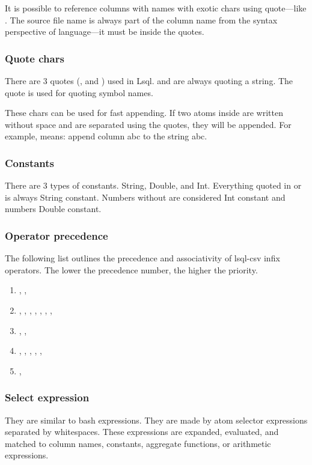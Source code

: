 It is possible to reference columns with names with exotic chars using  quote---like . The source file name is always part of the column name from the syntax perspective of language---it must be inside the quotes.

\subsubsection{Quote chars}
There are 3 quotes (,  and ) used in Lsql.  and  are always quoting a string. The  quote is used for quoting symbol names.

These chars can be used for fast appending. If two atoms inside  are written without space and are separated using the quotes, they will be appended. For example,  means: append column abc to the string abc.

\subsubsection{Constants}
There are 3 types of constants. String, Double, and Int. Everything quoted in  or  is always String constant. Numbers without \icode{[0-9]+} are considered Int constant and numbers  Double constant.

\subsubsection{Operator precedence}
The following list outlines the precedence and associativity of lsql-csv infix operators. The lower the precedence number, the higher the priority.

\begin{enumerate}
    \item {}, \icode{**}, \icode{\^}
    \item \icode{*}, \icode{/}, , , , , , 
    \item \icode{++}, \icode{+}, \icode{-}
    \item \icode{\textless=}, \icode{\textgreater=}, \icode{\textless}, \icode{\textgreater}, \icode{!=}, \icode{==}
    \item \icode{$\vert\vert$}, \icode{\&\&}
\end{enumerate}

\subsubsection{Select expression}
They are similar to bash expressions\cite{bash-reference-manual}. They are made by atom selector expressions separated by whitespaces. These expressions are expanded, evaluated, and matched to column names, constants, aggregate functions, or arithmetic expressions.

